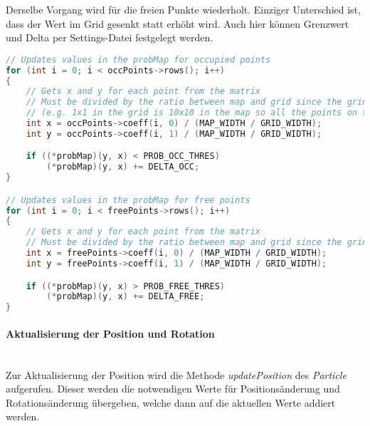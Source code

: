 Derselbe Vorgang wird für die freien Punkte wiederholt.
Einziger Unterschied ist, dass der Wert im Grid gesenkt statt erhöht wird.
Auch hier können Grenzwert und Delta per Settings-Datei festgelegt werden.

\begin{lstlisting}[caption={Auschnitt aus updateProbMap},label={lst:update-prob-map},language={C++}]
// Updates values in the probMap for occupied points
for (int i = 0; i < occPoints->rows(); i++)
{
    // Gets x and y for each point from the matrix
    // Must be divided by the ratio between map and grid since the grind is a fraction of the size to allow for some error
    // (e.g. 1x1 in the grid is 10x10 in the map so all the points on the map that lay in this 10x10 area will change the value of probability at that single point in the grid)
    int x = occPoints->coeff(i, 0) / (MAP_WIDTH / GRID_WIDTH);
    int y = occPoints->coeff(i, 1) / (MAP_WIDTH / GRID_WIDTH);

    if ((*probMap)(y, x) < PROB_OCC_THRES)
        (*probMap)(y, x) += DELTA_OCC;
}

// Updates values in the probMap for free points
for (int i = 0; i < freePoints->rows(); i++)
{
    // Gets x and y for each point from the matrix
    // Must be divided by the ratio between map and grid since the grind is a fraction of the size to allow for some error
    int x = freePoints->coeff(i, 0) / (MAP_WIDTH / GRID_WIDTH);
    int y = freePoints->coeff(i, 1) / (MAP_WIDTH / GRID_WIDTH);

    if ((*probMap)(y, x) > PROB_FREE_THRES)
        (*probMap)(y, x) += DELTA_FREE;
}
\end{lstlisting}

\paragraph{Aktualisierung der Position und Rotation} \mbox{} \\
\label{position_update}Zur Aktualisierung der Position wird die Methode \textit{updatePosition} des \textit{Particle} aufgerufen.
Dieser werden die notwendigen Werte für Positionsänderung und Rotationsänderung übergeben, welche dann auf die aktuellen Werte addiert werden.


